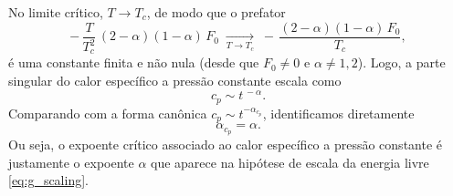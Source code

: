 \documentclass[11pt,a4paper]{article}
\begin{document}
%
No limite crítico, \(T\to T_c\), de modo que o prefator
%
\begin{equation}
    -\,
    \frac{T}{T_c^{2}}\,
    (2-\alpha)(1-\alpha)\,F_0
    \;\xrightarrow[T\to T_c]{}\;
    -\,
    \frac{(2-\alpha)(1-\alpha)\,F_0}{T_c},
    \label{eq:prefator_finito_p1}
\end{equation}
%
é uma constante finita e não nula (desde que \(F_0\neq0\) e
\(\alpha\neq1,2\)). Logo, a parte singular do calor específico a pressão
constante escala como
%
\begin{equation}
    \boxed{
    c_p
    \sim
    t^{\,-\alpha}.
    }
    \label{eq:cp_scaling}
\end{equation}
%
Comparando com a forma canônica \(c_p\sim t^{-\alpha_{c_p}}\), identificamos
diretamente
%
\begin{equation}
    \boxed{
    \alpha_{c_p}=\alpha.
    }
    \label{eq:expoente_cp_p1}
\end{equation}
%
Ou seja, o expoente crítico associado ao calor específico a pressão
constante é justamente o expoente \(\alpha\) que aparece na hipótese de
escala da energia livre \eqref{eq:g_scaling}.
%
\end{document}

